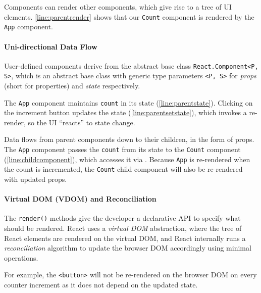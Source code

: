 Components can render other components, which give rise to
a tree of UI elements. \cref{line:parentrender} shows that our
\texttt{Count} component is rendered by 
the \texttt{App} component.

\paragraph{Uni-directional Data Flow}
User-defined components derive from the abstract base class
\texttt{React.Component<P, S>},
which is an abstract base class with generic type parameters
\texttt{<P, S>} for \textit{props} (short for properties) and 
\textit{state} respectively.

The \texttt{App} component maintains \texttt{count} in its
state (\cref{line:parentstate}). Clicking on the increment button
updates the state (\cref{line:parentsetstate}), which invokes
a re-render, so the UI ``reacts'' to state change.

Data flows from parent components down to their children,
in the form of props. 
The \texttt{App} component passes the \texttt{count}
from its state to the \texttt{Count} component 
(\cref{line:childcomponent}), which accesses it via
. 
Because \texttt{App} is re-rendered when the count is incremented,
the \texttt{Count} child component will also be re-rendered
with updated props.

\paragraph{Virtual DOM (VDOM) and Reconciliation}
The \texttt{render()} methods give the developer a declarative API
to specify what should be rendered. React uses a 
\textit{virtual DOM} abstraction, where the tree of React elements
are rendered on the virtual DOM, and React internally
runs a \textit{reconciliation} algorithm to update the browser DOM
accordingly using minimal operations.

For example, the \texttt{<button>} will not be re-rendered
on the browser DOM on every counter increment as it does not
depend on the updated state.
